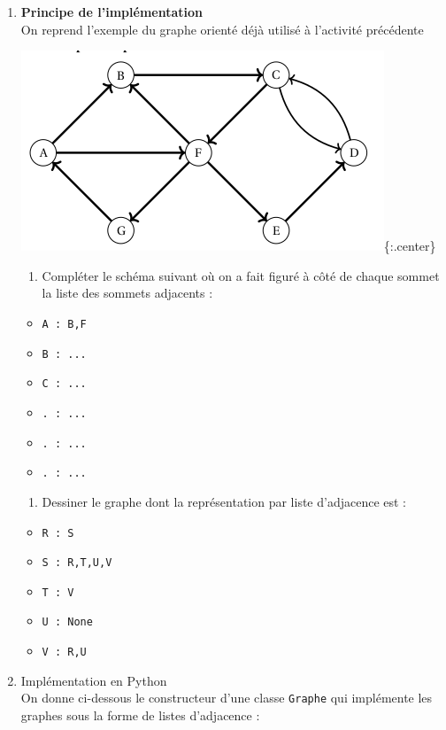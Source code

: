 \documentclass[
  letterpaper,
  DIV=11,
  numbers=noendperiod]{scrartcl}
\providecommand{\tightlist}{%
  \setlength{\itemsep}{0pt}\setlength{\parskip}{0pt}}\usepackage{longtable,booktabs,array}
\begin{document}
\begin{enumerate}
\def\labelenumi{\arabic{enumi}.}
\item
  \textbf{Principe de l'implémentation}\\
  On reprend l'exemple du graphe orienté déjà utilisé à l'activité
  précédente

  \includegraphics{data/graphe21.png}\{:.center\}

  \begin{enumerate}
  \def\labelenumii{\alph{enumii}.}
  \tightlist
  \item
    Compléter le schéma suivant où on a fait figuré à côté de chaque
    sommet la liste des sommets adjacents :
  \end{enumerate}

  \begin{itemize}
  \tightlist
  \item
    \texttt{A\ :\ B,F}
  \item
    \texttt{B\ :\ ...}
  \item
    \texttt{C\ :\ ...}
  \item
    \texttt{.\ :\ ...}
  \item
    \texttt{.\ :\ ...}
  \item
    \texttt{.\ :\ ...}
  \end{itemize}

  \begin{enumerate}
  \def\labelenumii{\alph{enumii}.}
  \setcounter{enumii}{1}
  \tightlist
  \item
    Dessiner le graphe dont la représentation par liste d'adjacence est
    :
  \end{enumerate}

  \begin{itemize}
  \tightlist
  \item
    \texttt{R\ :\ S}
  \item
    \texttt{S\ :\ R,T,U,V}
  \item
    \texttt{T\ :\ V}
  \item
    \texttt{U\ :\ None}
  \item
    \texttt{V\ :\ R,U}
  \end{itemize}
\item
  Implémentation en Python\\
  On donne ci-dessous le constructeur d'une classe \texttt{Graphe} qui
  implémente les graphes sous la forme de listes d'adjacence :


\end{enumerate}
\end{document}
